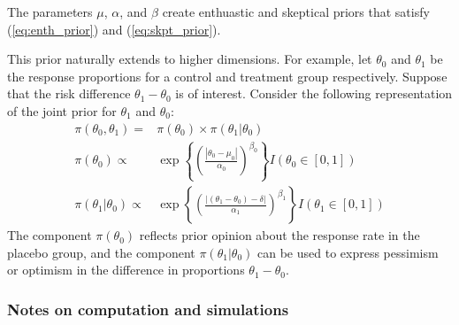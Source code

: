 \documentclass[12pt]{article}
\begin{document}
The parameters $\mu$, $\alpha$, and $\beta$ create enthuastic and skeptical priors that satisfy (\ref{eq:enth_prior}) and (\ref{eq:skpt_prior}).

This prior naturally extends to higher dimensions. For example, let $\theta_0$ and $\theta_1$ be the response proportions for a control and treatment group respectively. Suppose that the risk difference $\theta_1-\theta_0$ is of interest.
Consider the following representation of the joint prior for $\theta_1$ and $\theta_0$:
\begin{align}
\pi(\theta_0,\theta_1)=&\pi(\theta_0)\times\pi(\theta_1|\theta_0) \label{eq:generalized_normal_joint}\\
\pi(\theta_0)\propto&\exp\left\{\left(\frac{|\theta_0-\mu_0|}{\alpha_0}\right)^{\beta_0}\right\}I(\theta_0\in[0,1]) \label{eq:generalized_normal_PC}\\
\pi(\theta_1|\theta_0)\propto&\exp\left\{\left(\frac{|(\theta_1-\theta_0)-\delta|}{\alpha_1}\right)^{\beta_1}\right\}I(\theta_1\in[0,1]) \label{eq:generalized_normal_IP}
\end{align}
The component $\pi(\theta_0)$ reflects prior opinion about the response rate in the placebo group, and the component $\pi(\theta_1|\theta_0)$ can be used to express pessimism or optimism in the difference in proportions $\theta_1 - \theta_0$. 
\subsubsection*{Notes on computation and simulations}
%
%
\end{document}
